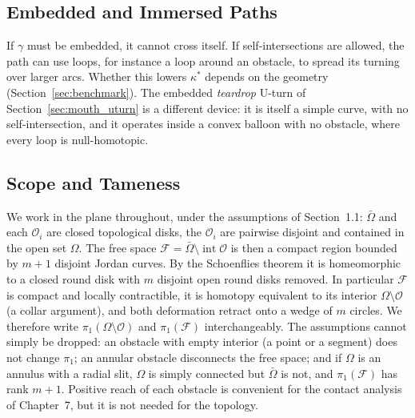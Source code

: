 \documentclass[11pt,reqno]{amsart}
\theoremstyle{definition}
\numberwithin{equation}{section}
\begin{document}
\subsection{Embedded and Immersed Paths}
If $\gamma$ must be embedded, it cannot cross itself. If self-intersections are allowed, the path can use loops, for instance a loop around an obstacle, to spread its turning over larger arcs. Whether this lowers $\kappa^*$ depends on the geometry (Section~\ref{sec:benchmark}). The embedded \emph{teardrop} U-turn of Section~\ref{sec:mouth_uturn} is a different device: it is itself a simple curve, with no self-intersection, and it operates inside a convex balloon with no obstacle, where every loop is null-homotopic.

\subsection{Scope and Tameness}
We work in the plane throughout, under the assumptions of Section~1.1: $\bar\Omega$ and each $\mathcal{O}_i$ are closed topological disks, the $\mathcal{O}_i$ are pairwise disjoint and contained in the open set $\Omega$. The free space $\mathcal{F} = \bar\Omega \setminus \operatorname{int}\mathcal{O}$ is then a compact region bounded by $m+1$ disjoint Jordan curves. By the Schoenflies theorem it is homeomorphic to a closed round disk with $m$ disjoint open round disks removed. In particular $\mathcal{F}$ is compact and locally contractible, it is homotopy equivalent to its interior $\Omega \setminus \mathcal{O}$ (a collar argument), and both deformation retract onto a wedge of $m$ circles. We therefore write $\pi_1(\Omega \setminus \mathcal{O})$ and $\pi_1(\mathcal{F})$ interchangeably. The assumptions cannot simply be dropped: an obstacle with empty interior (a point or a segment) does not change $\pi_1$; an annular obstacle disconnects the free space; and if $\Omega$ is an annulus with a radial slit, $\Omega$ is simply connected but $\bar\Omega$ is not, and $\pi_1(\mathcal{F})$ has rank $m+1$. Positive reach of each obstacle \cite{federer1959} is convenient for the contact analysis of Chapter~7, but it is not needed for the topology.
\end{document}
